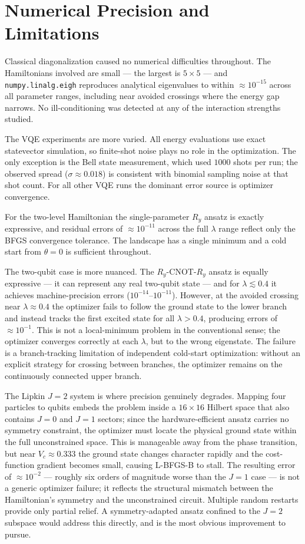 \section{Numerical Precision and Limitations}\label{sec:numerical-stability}

Classical diagonalization caused no numerical difficulties throughout. The Hamiltonians involved are small — the largest is $5\times5$ — and \texttt{numpy.linalg.eigh} reproduces analytical eigenvalues to within $\approx10^{-15}$ across all parameter ranges, including near avoided crossings where the energy gap narrows. No ill-conditioning was detected at any of the interaction strengths studied.

The VQE experiments are more varied. All energy evaluations use exact statevector simulation, so finite-shot noise plays no role in the optimization. The only exception is the Bell state measurement, which used $1000$ shots per run; the observed spread ($\sigma\approx0.018$) is consistent with binomial sampling noise at that shot count. For all other VQE runs the dominant error source is optimizer convergence.

For the two-level Hamiltonian the single-parameter $R_y$ ansatz is exactly expressive, and residual errors of $\approx10^{-11}$ across the full $\lambda$ range reflect only the BFGS convergence tolerance. The landscape has a single minimum and a cold start from $\theta=0$ is sufficient throughout.

The two-qubit case is more nuanced. The $R_y$-CNOT-$R_y$ ansatz is equally expressive — it can represent any real two-qubit state — and for $\lambda\lesssim0.4$ it achieves machine-precision errors ($10^{-14}$--$10^{-11}$). However, at the avoided crossing near $\lambda\approx0.4$ the optimizer fails to follow the ground state to the lower branch and instead tracks the first excited state for all $\lambda>0.4$, producing errors of $\approx10^{-1}$. This is not a local-minimum problem in the conventional sense; the optimizer converges correctly at each $\lambda$, but to the wrong eigenstate. The failure is a branch-tracking limitation of independent cold-start optimization: without an explicit strategy for crossing between branches, the optimizer remains on the continuously connected upper branch.

The Lipkin $J=2$ system is where precision genuinely degrades. Mapping four particles to qubits embeds the problem inside a $16\times16$ Hilbert space that also contains $J=0$ and $J=1$ sectors; since the hardware-efficient ansatz carries no symmetry constraint, the optimizer must locate the physical ground state within the full unconstrained space. This is manageable away from the phase transition, but near $V_c\approx0.333$ the ground state changes character rapidly and the cost-function gradient becomes small, causing L-BFGS-B to stall. The resulting error of $\approx10^{-2}$ — roughly six orders of magnitude worse than the $J=1$ case — is not a generic optimizer failure; it reflects the structural mismatch between the Hamiltonian's symmetry and the unconstrained circuit. Multiple random restarts provide only partial relief. A symmetry-adapted ansatz confined to the $J=2$ subspace would address this directly, and is the most obvious improvement to pursue.

